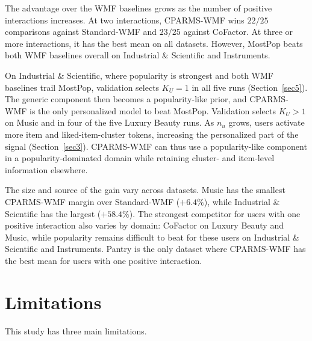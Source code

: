 \documentclass[pdflatex,sn-vancouver-num]{sn-jnl}%
\theoremstyle{thmstyleone}%
\theoremstyle{thmstyletwo}%
\theoremstyle{thmstylethree}%
\begin{document}
The advantage over the WMF baselines grows as the number of positive interactions increases. At two interactions, CPARMS-WMF wins $22/25$ comparisons against Standard-WMF and $23/25$ against CoFactor. At three or more interactions, it has the best mean on all datasets. However, MostPop beats both WMF baselines overall on Industrial \& Scientific and Instruments.

On Industrial \& Scientific, where popularity is strongest and both WMF baselines trail MostPop, validation selects $K_U=1$ in all five runs (Section~\ref{sec5}). The generic component then becomes a popularity-like prior, and CPARMS-WMF is the only personalized model to beat MostPop. Validation selects $K_U>1$ on Music and in four of the five Luxury Beauty runs. As $n_u$ grows, users activate more item and liked-item-cluster tokens, increasing the personalized part of the signal (Section~\ref{sec3}). CPARMS-WMF can thus use a popularity-like component in a popularity-dominated domain while retaining cluster- and item-level information elsewhere.

The size and source of the gain vary across datasets. Music has the smallest CPARMS-WMF margin over Standard-WMF ($+6.4\%$), while Industrial \& Scientific has the largest ($+58.4\%$). The strongest competitor for users with one positive interaction also varies by domain: CoFactor on Luxury Beauty and Music, while popularity remains difficult to beat for these users on Industrial \& Scientific and Instruments. Pantry is the only dataset where CPARMS-WMF has the best mean for users with one positive interaction.



\section{Limitations}

This study has three main limitations.
\end{document}
